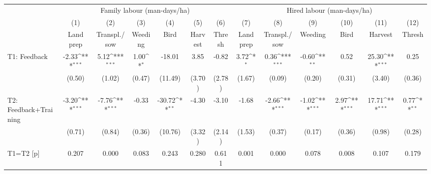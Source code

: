 {
\def\sym#1{\ifmmode^{#1}\else\(^{#1}\)\fi}
\begin{tabular}{l*{12}{c}}
\toprule
                    &\multicolumn{6}{c}{Family labour (man-days/ha)}                                                                                    &\multicolumn{6}{c}{Hired labour (man-days/ha)}                                                                                     \\\cmidrule(lr){2-7}\cmidrule(lr){8-13}
                    &\multicolumn{1}{c}{(1)}&\multicolumn{1}{c}{(2)}&\multicolumn{1}{c}{(3)}&\multicolumn{1}{c}{(4)}&\multicolumn{1}{c}{(5)}&\multicolumn{1}{c}{(6)}&\multicolumn{1}{c}{(7)}&\multicolumn{1}{c}{(8)}&\multicolumn{1}{c}{(9)}&\multicolumn{1}{c}{(10)}&\multicolumn{1}{c}{(11)}&\multicolumn{1}{c}{(12)}\\
                    &\multicolumn{1}{c}{Land prep}&\multicolumn{1}{c}{Transpl./sow}&\multicolumn{1}{c}{Weeding}&\multicolumn{1}{c}{Bird}&\multicolumn{1}{c}{Harvest}&\multicolumn{1}{c}{Thresh}&\multicolumn{1}{c}{Land prep}&\multicolumn{1}{c}{Transpl./sow}&\multicolumn{1}{c}{Weeding}&\multicolumn{1}{c}{Bird}&\multicolumn{1}{c}{Harvest}&\multicolumn{1}{c}{Thresh}\\
\midrule
T1: Feedback        &       -2.33\sym{***}&        5.12\sym{***}&        1.00\sym{*}  &      -18.01         &        3.85         &       -0.82         &        3.72\sym{*}  &        0.36\sym{***}&       -0.60\sym{**} &        0.52         &       25.30\sym{***}&        0.25         \\
                    &      (0.50)         &      (1.02)         &      (0.47)         &     (11.49)         &      (3.70)         &      (2.78)         &      (1.67)         &      (0.09)         &      (0.20)         &      (0.31)         &      (3.40)         &      (0.36)         \\
T2: Feedback+Training&       -3.20\sym{***}&       -7.76\sym{***}&       -0.33         &      -30.72\sym{**} &       -4.30         &       -3.10         &       -1.68         &       -2.66\sym{***}&       -1.02\sym{***}&        2.97\sym{***}&       17.71\sym{***}&        0.77\sym{**} \\
                    &      (0.71)         &      (0.84)         &      (0.36)         &     (10.76)         &      (3.32)         &      (2.14)         &      (1.53)         &      (0.37)         &      (0.17)         &      (0.36)         &      (0.98)         &      (0.28)         \\
\midrule
T1=T2 [p]           &       0.207         &       0.000         &       0.083         &       0.243         &       0.280         &       0.611         &       0.001         &       0.000         &       0.078         &       0.008         &       0.107         &       0.179         \\

\end{tabular}}
